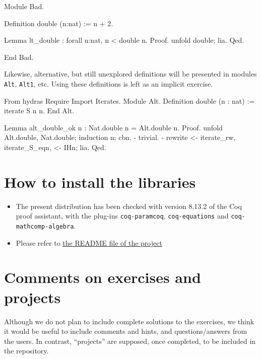 \documentclass[a4paper]{book}
\begin{document}
\begin{Coqbad}
Module Bad.

Definition double (n:nat)  := n + 2.
 
Lemma lt_double : forall n:nat, n < double  n.
Proof.
   unfold double; lia.
Qed.

End Bad.
\end{Coqbad}

Likewise, alternative, but still unexplored definitions will be presented in modules
\texttt{Alt}, \texttt{Alt1}, etc. Using these definitions is left as an implicit exercise.


\begin{Coqalt}
From hydras Require Import Iterates.
Module Alt.
  Definition double (n : nat) := iterate S n n.
End Alt.
\end{Coqalt}

\begin{Coqsrc}
Lemma alt_double_ok n : Nat.double n = Alt.double n.
Proof.
  unfold Alt.double, Nat.double; induction n; cbn.
  -  trivial.
  -  rewrite <- iterate_rw, iterate_S_eqn, <- IHn; lia.
Qed.
\end{Coqsrc}






\section{How to install the libraries}
\label{sec:orgheadline4}
\begin{itemize}
\item The present distribution has been checked with version 8.13.2 of the Coq proof assistant, with the plug-ins \texttt{coq-paramcoq}, \texttt{coq-equations}
and \texttt{coq-mathcomp-algebra}.

\item Please refer to \href{https://github.com/coq-community/hydra-battles#readme}{the README file of the project}
\end{itemize}

\section{Comments on exercises and projects}

Although we do not plan to include complete solutions to the exercises, 
we think it would be useful to include comments and hints, and questions/answers from the users. In contrast, ``projects'' are supposed, once completed, to be included in the repository.
\end{document}
